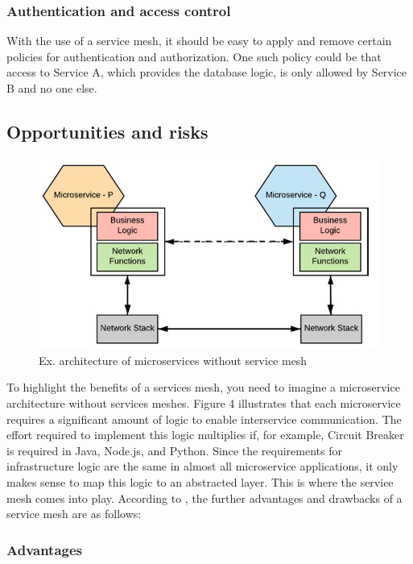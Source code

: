 \subsubsection{Authentication and access control}

With the use of a service mesh, it should be easy to apply and remove certain policies for authentication and authorization. One such policy could be that access to Service A, which provides the database logic, is only allowed by Service B and no one else.

\subsection{Opportunities and risks}

\begin{figure}
    \includegraphics[width=\columnwidth]{img/microservices_without_mesh.JPG}
    \caption{Ex. architecture of microservices without service mesh\cite[S. 265]{sm4}}
    \label{fig:microservice-without-mesh}
\end{figure}


To highlight the benefits of a services mesh, you need to imagine a microservice architecture without services meshes. Figure 4 illustrates that each microservice requires a significant amount of logic to enable interservice communication. The effort required to implement this logic multiplies if, for example, Circuit Breaker is required in Java, Node.js, and Python. Since the requirements for infrastructure logic are the same in almost all microservice applications, it only makes sense to map this logic to an abstracted layer. This is where the service mesh comes into play. According to \cite{sm4}, the further advantages and drawbacks of a service mesh are as follows:

\subsubsection{Advantages}

